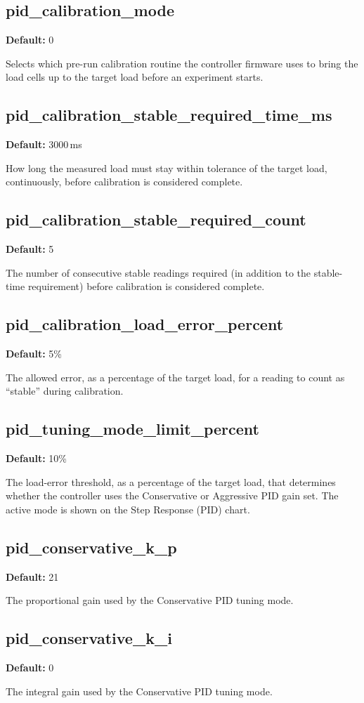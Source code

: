 \documentclass[12pt]{report}
\newcommand{\defaultval}[1]{\noindent\textbf{Default:} #1\par\smallskip\noindent}
\begin{document}
\subsection{pid\_calibration\_mode}
\defaultval{0}
Selects which pre-run calibration routine the controller firmware uses to bring the load cells up to the target load before an experiment starts.

\subsection{pid\_calibration\_stable\_required\_time\_ms}
\defaultval{3000\,ms}
How long the measured load must stay within tolerance of the target load, continuously, before calibration is considered complete.

\subsection{pid\_calibration\_stable\_required\_count}
\defaultval{5}
The number of consecutive stable readings required (in addition to the stable-time requirement) before calibration is considered complete.

\subsection{pid\_calibration\_load\_error\_percent}
\defaultval{5\%}
The allowed error, as a percentage of the target load, for a reading to count as ``stable'' during calibration.

\subsection{pid\_tuning\_mode\_limit\_percent}
\defaultval{10\%}
The load-error threshold, as a percentage of the target load, that determines whether the controller uses the Conservative or Aggressive PID gain set. The active mode is shown on the Step Response (PID) chart.

\subsection{pid\_conservative\_k\_p}
\defaultval{21}
The proportional gain used by the Conservative PID tuning mode.

\subsection{pid\_conservative\_k\_i}
\defaultval{0}
The integral gain used by the Conservative PID tuning mode.
\end{document}
